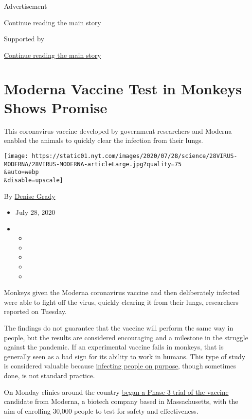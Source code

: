 Advertisement

\protect\hyperlink{after-top}{Continue reading the main story}

Supported by

\protect\hyperlink{after-sponsor}{Continue reading the main story}

\hypertarget{moderna-vaccine-test-in-monkeys-shows-promise}{%
\section{Moderna Vaccine Test in Monkeys Shows
Promise}\label{moderna-vaccine-test-in-monkeys-shows-promise}}

This coronavirus vaccine developed by government researchers and Moderna
enabled the animals to quickly clear the infection from their lungs.

\texttt{[image: https://static01.nyt.com/images/2020/07/28/science/28VIRUS-MODERNA/28VIRUS-MODERNA-articleLarge.jpg?quality=75\\\&auto=webp\\\&disable=upscale]}

By \href{https://www.nytimes.com/by/denise-grady}{Denise Grady}

\begin{itemize}
\item
  July 28, 2020
\item
  \begin{itemize}
  \item
  \item
  \item
  \item
  \item
  \end{itemize}
\end{itemize}

Monkeys given the Moderna coronavirus vaccine and then deliberately
infected were able to fight off the virus, quickly clearing it from
their lungs, researchers reported on Tuesday.

The findings do not guarantee that the vaccine will perform the same way
in people, but the results are considered encouraging and a milestone in
the struggle against the pandemic. If an experimental vaccine fails in
monkeys, that is generally seen as a bad sign for its ability to work in
humans. This type of study is considered valuable because
\href{https://www.nytimes.com/2020/07/01/health/coronavirus-vaccine-trials.html?searchResultPosition=1}{infecting
people on purpose}, though sometimes done, is not standard practice.

On Monday clinics around the country
\href{https://www.nytimes.com/2020/07/27/health/moderna-vaccine-covid.html?searchResultPosition=1}{began
a Phase 3 trial of the vaccine} candidate from Moderna, a biotech
company based in Massachusetts, with the aim of enrolling 30,000 people
to test for safety and effectiveness.

